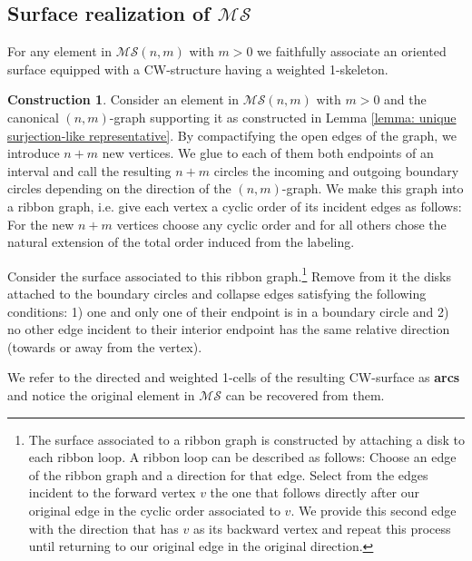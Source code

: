 \documentclass{amsart}
\newcommand{\MS}{\mathcal{MS}}
\renewcommand{\1}{\mathbf{1}}
\theoremstyle{definition}
\newtheorem{construction}[theorem]{Construction}
\begin{document}
\subsection{Surface realization of $\MS$} 

For any element in $\MS(n,m)$ with $m>0$ we faithfully associate an oriented surface equipped with a CW-structure having a weighted 1-skeleton. 

\begin{construction} \label{construction: arc surface}
	Consider an element in $\MS(n,m)$ with $m>0$ and the canonical $(n,m)$-graph supporting it as constructed in Lemma \ref{lemma: unique surjection-like representative}. By compactifying the open edges of the graph, we introduce $n+m$ new vertices. We glue to each of them both endpoints of an interval and call the resulting $n+m$ circles the incoming and outgoing boundary circles depending on the direction of the $(n,m)$-graph. We make this graph into a ribbon graph, i.e. give each vertex a cyclic order of its incident edges as follows: For the new $n+m$ vertices choose any cyclic order and for all others chose the natural extension of the total order induced from the labeling.	
	
	Consider the surface associated to this ribbon graph.\footnote{The surface associated to a ribbon graph is constructed by attaching a disk to each ribbon loop. A ribbon loop can be described as follows: Choose an edge of the ribbon graph and a direction for that edge. Select from the edges incident to the forward vertex $v$ the one that follows directly after our original edge in the cyclic order associated to $v$. We provide this second edge with the direction that has $v$ as its backward vertex and repeat this process until returning to our original edge in the original direction.} Remove from it the disks attached to the boundary circles and collapse edges satisfying the following conditions: 1) one and only one of their endpoint is in a boundary circle and 2) no other edge incident to their interior endpoint has the same relative direction (towards or away from the vertex).
	
	We refer to the directed and weighted 1-cells of the resulting CW-surface as \textbf{arcs} and notice the original element in $\MS$ can be recovered from them. \vspace*{-8pt}
\end{construction}
\end{document}
